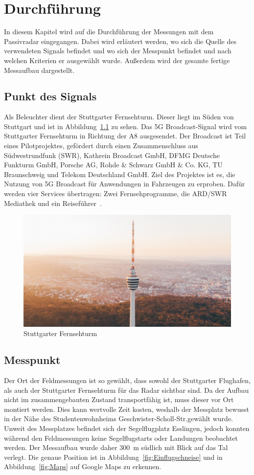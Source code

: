 \chapter{Durchführung}
In diesem Kapitel wird auf die Durchführung der Messungen mit dem Passivradar eingegangen. Dabei wird erläutert werden, wo sich die Quelle des verwendeten Signals befindet und wo sich der Messpunkt befindet und nach welchen Kriterien er ausgewählt wurde. Außerdem wird der gesamte fertige Messaufbau dargestellt.
\section{Punkt des Signals}
Als Beleuchter dient der Stuttgarter Fernsehturm. Dieser liegt im Süden von Stuttgart und ist in Abbildung~\ref{fig:Fernsehturm} zu sehen. Das 5G Broadcast-Signal wird vom Stuttgarter Fernsehturm in Richtung der A8 ausgesendet. Der Broadcast ist Teil eines Pilotprojektes, gefördert durch einen Zusammenschluss aus Südwestrundfunk (SWR), Kathrein Broadcast GmbH,  DFMG  Deutsche Funkturm GmbH, Porsche AG, Rohde \& Schwarz GmbH \& Co. KG, TU Braunschweig und Telekom Deutschland GmbH. Ziel des Projektes ist es, die Nutzung von 5G Broadcast für Anwendungen in Fahrzeugen zu erproben. Dafür werden vier Services übertragen: Zwei Fernsehprogramme, die ARD/SWR Mediathek und ein Reiseführer~\cite{5GMAG2020}.
\begin{figure}
    \centering
    \includegraphics[width=\textwidth]{images/Fernsehturm.jpg}
    \caption{Stuttgarter Fernsehturm}\label{fig:Fernsehturm}
\end{figure}

\section{Messpunkt}
Der Ort der Feldmessungen ist so gewählt, dass sowohl der Stuttgarter Flughafen, als auch der Stuttgarter Fernsehturm für das Radar sichtbar sind. Da der Aufbau nicht im zusammengebauten Zustand transportfähig ist, muss dieser vor Ort montiert werden. Dies kann wertvolle Zeit kosten, weshalb der Messplatz bewusst in der Nähe des Studentenwohnheims Geschwister-Scholl-Str.\@ gewählt wurde. Unweit des Messplatzes befindet sich der Segelflugplatz Esslingen, jedoch konnten während den Feldmessungen keine Segelflugstarts oder Landungen beobachtet werden. Der Messaufbau wurde daher \SI{300}{\metre} südlich mit Blick auf das Tal verlegt. Die genaue Position ist in Abbildung~\ref{fig:Einflugschneise} und in Abbildung~\ref{fig:Maps} auf Google Maps zu erkennen.

